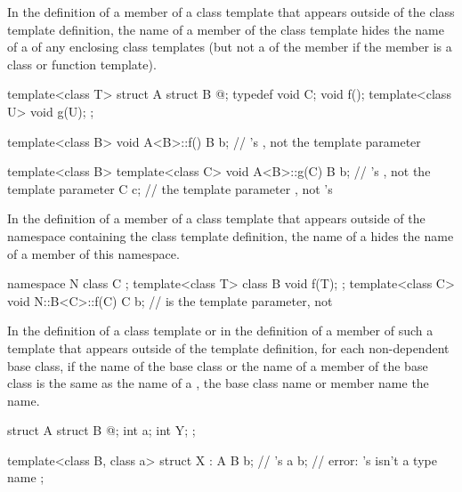 \pnum
In the definition of a member of
a class template that appears outside of the class template definition,
the name of a member of the class template hides the name of a
of any enclosing class templates (but not a  of the
member if the member is a class or function template).
\begin{example}
\begin{codeblock}
template<class T> struct A {
  struct B { @\commentellip@ };
  typedef void C;
  void f();
  template<class U> void g(U);
};

template<class B> void A<B>::f() {
  B b;              // 's , not the template parameter
}

template<class B> template<class C> void A<B>::g(C) {
  B b;              // 's , not the template parameter
  C c;              // the template parameter , not 's 
}
\end{codeblock}
\end{example}

\pnum
In the definition of a member of a class template that appears outside of the
namespace containing the class template definition,
the name of a
hides the name of a member of this namespace.
\begin{example}
\begin{codeblock}
namespace N {
  class C { };
  template<class T> class B {
    void f(T);
  };
}
template<class C> void N::B<C>::f(C) {
  C b;              //  is the template parameter, not 
}
\end{codeblock}
\end{example}

\pnum
In the definition of a class template or in the definition of a member of such
a template that appears outside of the template definition,
for each non-dependent base class,
if the name of the base class
or the name of a member of the
base class is the same as the name of a
,
the base class name or member name  the
name.
\begin{example}
\begin{codeblock}
struct A {
  struct B { @\commentellip@ };
  int a;
  int Y;
};

template<class B, class a> struct X : A {
  B b;              // 's 
  a b;              // error: 's  isn't a type name
};
\end{codeblock}
\end{example}

